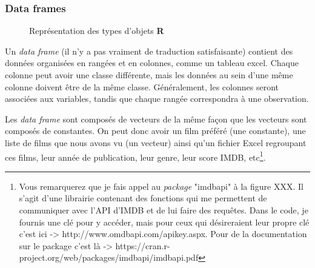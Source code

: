 \documentclass[10.5pt,a4paper]{article}
\begin{document}
    \subsubsection{Data frames}
    
    \begin{figure}
      \centering
      \caption{Représentation des types d'objets \textbf{R}}
      \label{lego}
    \end{figure}
    
    Un \emph{data frame} (il n'y a pas vraiment de traduction satisfaisante) contient des données organisées en rangées et en colonnes, comme un tableau excel. Chaque colonne peut avoir une classe différente, mais les données au sein d’une même colonne doivent être de la même classe. Généralement, les colonnes seront associées aux variables, tandis que chaque rangée correspondra à une observation. 
    
    Les \emph{data frame} sont composés de vecteurs de la même façon que les vecteurs sont composés de constantes. On peut donc avoir un film préféré (une constante), une liste de films que nous avons vu (un vecteur) ainsi qu'un fichier Excel regroupant ces films, leur année de publication, leur genre, leur score IMDB, etc\footnote{Vous remarquerez que je fais appel au \emph{package} "imdbapi" à la figure XXX. Il s'agit d'une librairie contenant des fonctions qui me permettent de communiquer avec l'API d'IMDB et de lui faire des requêtes. Dans le code, je fournis une clé pour y accéder, mais pour ceux qui désireraient leur propre clé c'est ici -> http://www.omdbapi.com/apikey.aspx. Pour de la documentation sur le package c'est là -> https://cran.r-project.org/web/packages/imdbapi/imdbapi.pdf}. 
    
\end{document}
